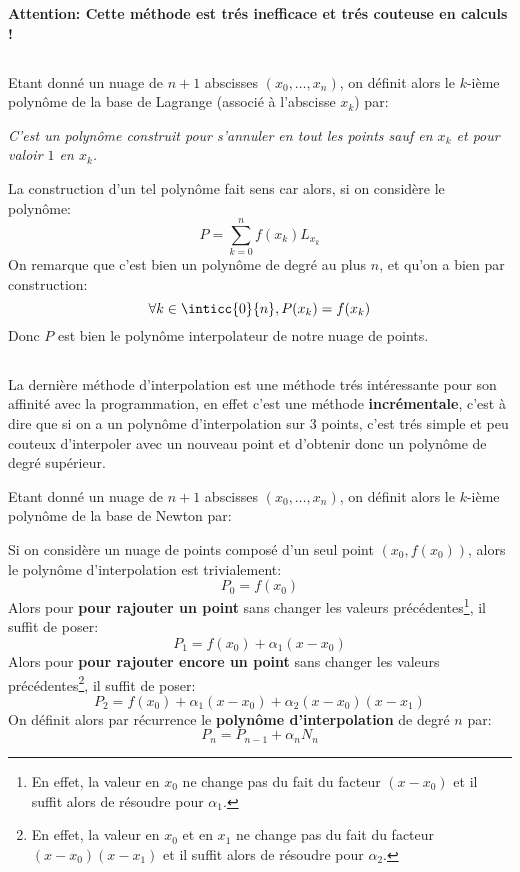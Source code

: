 \begin{center}
   \textbf{Attention: Cette méthode est trés inefficace et trés couteuse en calculs !}
\end{center}
\subsection*{}
Etant donné un nuage de \(n + 1\) abscisses \((x_0, \ldots, x_n)\), on définit alors le \(k\)-ième polynôme de la base de Lagrange (associé à l'abscisse \(x_k\)) par:
\begin{center}
   \textit{C'est un polynôme construit pour s'annuler en tout les points sauf en \(x_k\) et pour valoir \(1\) en \(x_k\).}
\end{center}
La construction d'un tel polynôme fait sens car alors, si on considère le polynôme:
\[
   P = \sum_{k=0}^{n}f(x_k)L_{x_k}
\]
On remarque que c'est bien un polynôme de degré au plus \(n\), et qu'on a bien par construction: 
\[
   \forall k \in \inticc{0}{n} , P(x_k) = f(x_k)
\] 
Donc \(P\) est bien le polynôme interpolateur de notre nuage de points.
\subsection*{}
La dernière méthode d'interpolation est une méthode trés intéressante pour son affinité avec la programmation, en effet c'est une méthode \textbf{incrémentale}, c'est à dire que si on a un polynôme d'interpolation sur \(3\) points, c'est trés simple et peu couteux d'interpoler avec un nouveau point et d'obtenir donc un polynôme de degré supérieur.\<

Etant donné un nuage de \(n + 1\) abscisses \((x_0, \ldots, x_n)\), on définit alors le \(k\)-ième polynôme de la base de Newton par:

Si on considère un nuage de points composé d'un seul point \((x_0, f(x_0))\), alors le polynôme d'interpolation est trivialement:
\[
   P_0 = f(x_0)
\]
Alors pour \textbf{pour rajouter un point} sans changer les valeurs précédentes\footnote[1]{En effet, la valeur en \(x_0\) ne change pas du fait du facteur \((x-x_0)\) et il suffit alors de résoudre pour \(\alpha_1\).
}, il suffit de poser:
\[
   P_1 = f(x_0) + \alpha_1(x - x_0)
\]
Alors pour \textbf{pour rajouter encore un point} sans changer les valeurs précédentes\footnote[2]{En effet, la valeur en \(x_0\) et en \(x_1\) ne change pas du fait du facteur \((x-x_0)(x-x_1)\) et il suffit alors de résoudre pour \(\alpha_2\).}, il suffit de poser:
\[
   P_2 = f(x_0) + \alpha_1(x - x_0) + \alpha_2(x-x_0)(x-x_1)
\]
On définit alors par récurrence le \textbf{polynôme d'interpolation} de degré \(n\) par:
\[
   P_n = P_{n-1} + \alpha_{n}N_n
\]

